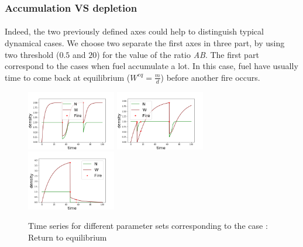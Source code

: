 \documentclass{article}
\begin{document}
\subsubsection{Accumulation VS depletion}

\paragraph{}
Indeed, the two previously defined axes could help to distinguish typical dynamical cases. We choose two separate the first axes in three part, by using two threshold ($0.5$ and $20$) for the value of the ratio \textit{AB}. The first part correspond to the cases when fuel accumulate a lot. In this case, fuel have usually time to come back at equilibrium ($W^{eq}=\frac{m}{d}$) before another fire occurs.

\begin{figure}[h!]
\centering
\includegraphics[width=3.9cm]{return_to_eq_1.png}
\includegraphics[width=3.9cm]{return_to_eq_2.png}
\includegraphics[width=3.9cm]{return_to_eq_3.png}
\caption{Time series for different parameter sets corresponding to the case : Return to equilibrium}
\end{figure}
\end{document}
